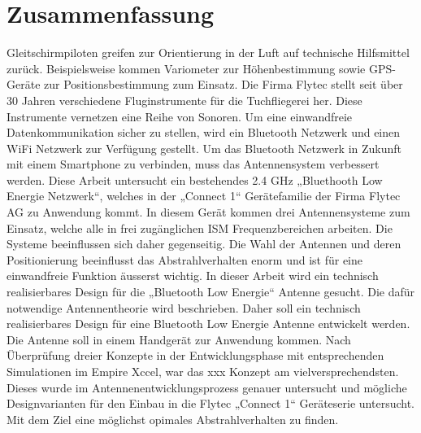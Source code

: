 \section*{Zusammenfassung}

Gleitschirmpiloten greifen zur Orientierung in der Luft auf technische Hilfsmittel zurück. Beispielsweise kommen Variometer zur Höhenbestimmung sowie GPS-Geräte zur Positionsbestimmung zum Einsatz. Die Firma Flytec stellt seit über 30 Jahren verschiedene Fluginstrumente für die Tuchfliegerei her. Diese Instrumente vernetzen eine Reihe von Sonoren. Um eine einwandfreie Datenkommunikation sicher zu stellen, wird ein Bluetooth Netzwerk und einen WiFi Netzwerk zur Verfügung gestellt. Um das Bluetooth Netzwerk in Zukunft mit einem Smartphone zu verbinden, muss das Antennensystem verbessert werden.
Diese Arbeit untersucht ein bestehendes 2.4 GHz „Bluethooth Low Energie Netzwerk“, welches in der „Connect 1“ Gerätefamilie der Firma Flytec AG zu Anwendung kommt. In diesem  Gerät kommen drei Antennensysteme zum Einsatz, welche alle in frei zugänglichen ISM Frequenzbereichen arbeiten. Die Systeme beeinflussen sich daher gegenseitig. Die Wahl der Antennen und deren Positionierung beeinflusst das Abstrahlverhalten enorm und ist für eine einwandfreie Funktion äusserst wichtig. In dieser Arbeit wird ein technisch realisierbares Design für die „Bluetooth Low Energie“ Antenne gesucht. Die dafür notwendige Antennentheorie wird beschrieben. Daher soll ein technisch realisierbares Design für eine Bluetooth Low Energie Antenne entwickelt werden. Die Antenne soll in einem Handgerät zur Anwendung kommen. Nach Überprüfung dreier Konzepte in der Entwicklungsphase mit entsprechenden Simulationen im Empire Xccel, war das xxx Konzept am vielversprechendsten. Dieses wurde im Antennenentwicklungsprozess genauer untersucht und mögliche Designvarianten für den Einbau in die Flytec „Connect 1“ Geräteserie untersucht. Mit dem Ziel eine möglichst opimales Abstrahlverhalten zu finden.
